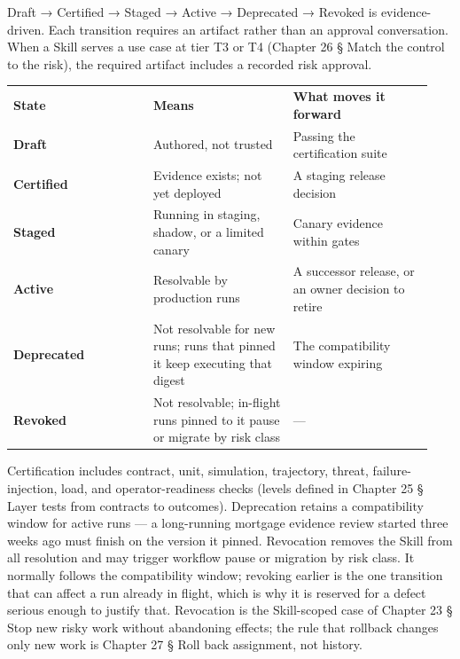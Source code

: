 Draft → Certified → Staged → Active → Deprecated → Revoked is evidence-driven. Each transition requires an artifact rather than an approval conversation. When a Skill serves a use case at tier T3 or T4 (Chapter 26 § Match the control to the risk), the required artifact includes a recorded risk approval.\par

\BookTableStart
\small
\begin{tabular}{@{}Y{0.3133\linewidth}Y{0.3133\linewidth}Y{0.3133\linewidth}@{}}
\color{white}\bfseries State & \color{white}\bfseries Means & \color{white}\bfseries What moves it forward \\
\textbf{Draft} & Authored, not trusted & Passing the certification suite \\
\textbf{Certified} & Evidence exists; not yet deployed & A staging release decision \\
\textbf{Staged} & Running in staging, shadow, or a limited canary & Canary evidence within gates \\
\textbf{Active} & Resolvable by production runs & A successor release, or an owner decision to retire \\
\textbf{Deprecated} & Not resolvable for new runs; runs that pinned it keep executing that digest & The compatibility window expiring \\
\textbf{Revoked} & Not resolvable; in-flight runs pinned to it pause or migrate by risk class & — \\
\end{tabular}
\BookTableEnd

Certification includes contract, unit, simulation, trajectory, threat, failure-injection, load, and operator-readiness checks (levels defined in Chapter 25 § Layer tests from contracts to outcomes). Deprecation retains a compatibility window for active runs — a long-running mortgage evidence review started three weeks ago must finish on the version it pinned. Revocation removes the Skill from all resolution and may trigger workflow pause or migration by risk class. It normally follows the compatibility window; revoking earlier is the one transition that can affect a run already in flight, which is why it is reserved for a defect serious enough to justify that. Revocation is the Skill-scoped case of Chapter 23 § Stop new risky work without abandoning effects; the rule that rollback changes only new work is Chapter 27 § Roll back assignment, not history.\par

